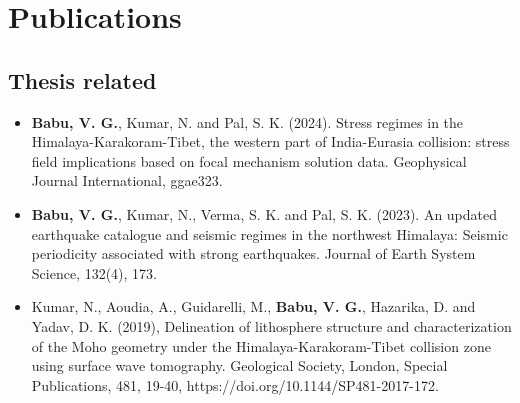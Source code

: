 \chapter*{Publications}


\section*{Thesis related}
\vspace{-0.5cm}
\begin{itemize}
    \item \textbf{Babu, V. G.}, Kumar, N. and Pal, S. K. (2024). Stress regimes in the Himalaya-Karakoram-Tibet, the western part of India-Eurasia collision: stress field implications based on focal mechanism solution data. Geophysical Journal International, ggae323.
    
    \item \textbf{Babu, V. G.}, Kumar, N., Verma, S. K. and Pal, S. K. (2023). An updated earthquake catalogue and seismic regimes in the northwest Himalaya: Seismic periodicity associated with strong earthquakes. Journal of Earth System Science, 132(4), 173.
    
    \item Kumar, N., Aoudia, A., Guidarelli, M., \textbf{Babu, V. G.}, Hazarika, D. and Yadav, D. K. (2019), Delineation of lithosphere structure and characterization of the Moho geometry under the Himalaya-Karakoram-Tibet collision zone using surface wave tomography. Geological Society, London, Special Publications, 481, 19-40, https://doi.org/10.1144/SP481-2017-172.
\end{itemize}

\vspace{-1cm}
